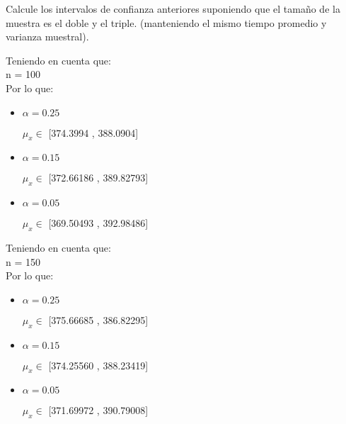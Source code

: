 Calcule los intervalos de confianza anteriores suponiendo que el tama\~no de la muestra es el doble y el
triple. (manteniendo el mismo tiempo promedio y varianza muestral).

Teniendo en cuenta que: \\

n = 100\\

Por lo que: \\

\begin{itemize}

\item $\alpha = 0.25$

$\mu_x \in$ [374.3994 , 388.0904]

\item $\alpha = 0.15$

$\mu_x \in$ [372.66186 , 389.82793]

\item $\alpha = 0.05$

$\mu_x \in$ [369.50493 , 392.98486]

\end{itemize}

Teniendo en cuenta que: \\

n = 150\\

Por lo que: \\

\begin{itemize}

\item $\alpha = 0.25$

$\mu_x \in$ [375.66685 , 386.82295]

\item $\alpha = 0.15$

$\mu_x \in$ [374.25560 , 388.23419]

\item $\alpha = 0.05$

$\mu_x \in$ [371.69972 , 390.79008]

\end{itemize}
